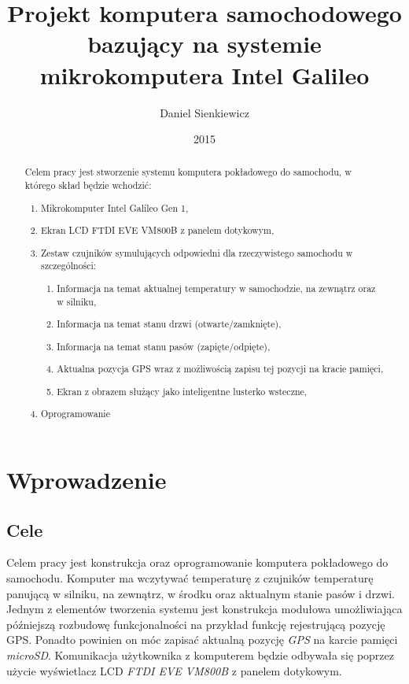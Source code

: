 \documentclass{xmgr}
\author   {Daniel Sienkiewicz}
\title    {Projekt komputera samochodowego bazujący na systemie mikrokomputera Intel Galileo}
\date     {2015}
\begin{document}
\begin{abstract}
Celem pracy jest stworzenie systemu komputera pokładowego do samochodu, w którego skład będzie wchodzić: 
\begin{enumerate}
\item Mikrokomputer Intel Galileo Gen 1, 
\item Ekran LCD FTDI EVE VM800B z panelem dotykowym, 
\item Zestaw czujników symulujących odpowiedni dla rzeczywistego samochodu w szczególności:
\begin{enumerate}
\item Informacja na temat aktualnej temperatury w samochodzie, na zewnątrz oraz w silniku,
\item Informacja na temat stanu drzwi (otwarte/zamknięte), 
\item Informacja na temat stanu pasów (zapięte/odpięte), 
\item Aktualna pozycja GPS wraz z możliwością zapisu tej pozycji na kracie pamięci,
\item Ekran z obrazem służący jako inteligentne lusterko wsteczne,
\end{enumerate}
\item Oprogramowanie
\end{enumerate}

\end{abstract}
\maketitle

\chapter{Wprowadzenie}
\section{Cele}
Celem pracy jest konstrukcja oraz oprogramowanie komputera pokładowego do samochodu. Komputer ma wczytywać temperaturę z czujników temperaturę panującą w silniku, na zewnątrz, w środku oraz aktualnym stanie pasów i drzwi. Jednym z elementów tworzenia systemu jest konstrukcja modułowa umożliwiająca późniejszą rozbudowę funkcjonalności na przykład funkcję rejestrującą pozycję GPS. Ponadto powinien on móc zapisać aktualną pozycję \emph{GPS} na karcie pamięci \emph{microSD}. Komunikacja użytkownika z komputerem będzie odbywała się poprzez użycie wyświetlacz LCD \emph{FTDI EVE VM800B} z panelem dotykowym.
\end{document}
